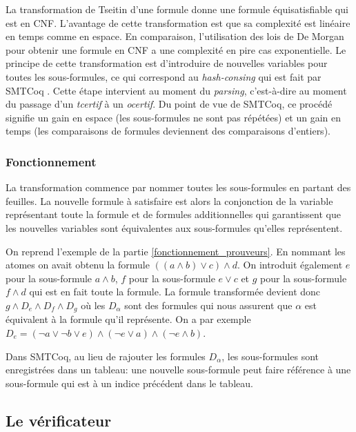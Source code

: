 \documentclass[11pt]{article}
\begin{document}
La transformation de Tseitin d'une formule donne une formule équisatisfiable qui est en CNF. L'avan\-tage de cette transformation est que sa complexité est linéaire en temps comme en espace. En comparaison, l'utilisation des lois de De Morgan pour obtenir une formule en CNF a une complexité en pire cas exponentielle. Le principe de cette transformation est d'introduire de nouvelles variables pour toutes les sous-formules, ce qui correspond au \textit{hash-consing} qui est fait par SMTCoq \cite{smtcoq_code}. Cette étape intervient au moment du \textit{parsing}, c'est-à-dire au moment du passage d'un \textit{tcertif} à un \textit{ocertif}. Du point de vue de SMTCoq, ce procédé signifie un gain en espace (les sous-formules ne sont pas répétées) et un gain en temps (les comparaisons de formules deviennent des comparaisons d'entiers).


\subsubsection{Fonctionnement}

La transformation commence par nommer toutes les sous-formules en partant des feuilles. La nouvelle formule à satisfaire est alors la conjonction de la variable représentant toute la formule et de formules additionnelles qui garantissent que les nouvelles variables sont équivalentes aux sous-formules qu'elles représentent. \medbreak

On reprend l'exemple de la partie \ref{fonctionnement_prouveurs}. En nommant les atomes on avait obtenu la formule $((a \wedge b) \vee c) \wedge d$. On introduit également $e$ pour la sous-formule $a \wedge b$, $f$ pour la sous-formule $e \vee c$ et $g$ pour la sous-formule $f \wedge d$ qui est en fait toute la formule. La formule transformée devient donc $g \wedge D_e \wedge D_f \wedge D_g$ où les $D_\alpha$ sont des formules qui nous assurent que $\alpha$ est équivalent à la formule qu'il représente. On a par exemple $D_e = (\neg a \vee \neg b \vee e) \wedge (\neg e \vee a) \wedge (\neg e \wedge b)$. \medbreak

Dans SMTCoq, au lieu de rajouter les formules $D_\alpha$, les sous-formules sont enregistrées dans un tableau: une nouvelle sous-formule peut faire référence à une sous-formule qui est à un indice précédent dans le tableau. 

\subsection{Le vérificateur}
\end{document}
